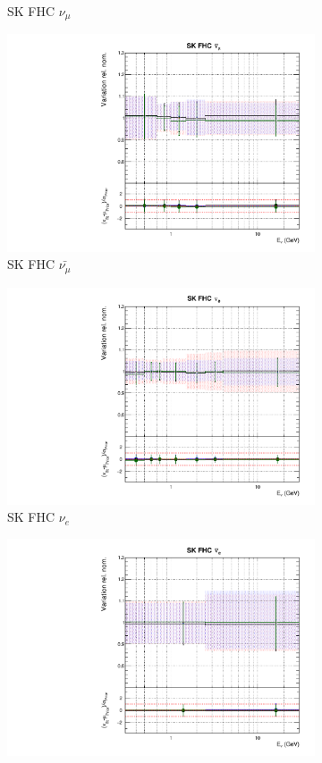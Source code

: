 \begin{figure}[!htbp]
\begin{subfigure}{0.45\textwidth}
  \caption{SK FHC $\nu_{\mu}$}
\end{subfigure}
\begin{subfigure}{0.45\textwidth}
  \centering
  \includegraphics[width=0.75\linewidth]{figs/polyasmvsflux_9}
  \caption{SK FHC $\bar{\nu_{\mu}}$}
\end{subfigure}
\begin{subfigure}{0.45\textwidth}
  \centering
  \includegraphics[width=0.75\linewidth]{figs/polyasmvsflux_10}
  \caption{SK FHC $\nu_{e}$}
\end{subfigure}
\begin{subfigure}{0.45\textwidth}
  \centering
  \includegraphics[width=0.75\linewidth]{figs/polyasmvsflux_11}

\end{subfigure}
\end{figure}

